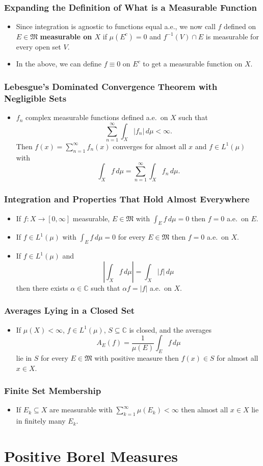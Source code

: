 \documentclass{article}
\newcounter{topicnumber}[section]
\newcommand{\steptopic}[1][1]{\addtocounter{topicnumber}{#1}}
\newenvironment{topic}[1]{%
\steptopic%
\subsubsection{#1}%
\begin{itemize}%
}{%
\end{itemize}%
}
\newcommand{\term}[1]{{\bf #1}}
\newcommand{\remark}{\item}
\begin{document}
\begin{topic}{Expanding the Definition of What is a Measurable Function}
\remark Since integration is agnostic to functions equal a.e., we now call $f$ defined on $E \in \mathfrak{M}$ \term{measurable on $X$} if $\mu(E^c) = 0$ and $f^{-1}(V) \cap E$ is measurable for every open set $V$.
\remark In the above, we can define $f \equiv 0$ on $E^c$ to get a measurable function on $X$.
\end{topic}

\begin{topic}{Lebesgue's Dominated Convergence Theorem with Negligible Sets}
\remark $f_n$ complex measurable functions defined a.e.\ on $X$ such that $$\sum_{n=1}^\infty \int_X |f_n|\,d\mu < \infty.$$ Then $f(x) = \sum_{n=1}^\infty f_n(x)$ converges for almost all $x$ and $f \in L^1(\mu)$ with $$\int_X f\,d\mu = \sum_{n=1}^\infty \int_X f_n\,d\mu.$$
\end{topic}

\begin{topic}{Integration and Properties That Hold Almost Everywhere}
\remark If $f : X \to [0, \infty]$ measurable, $E \in \mathfrak{M}$ with $\int_E f\,d\mu = 0$ then $f = 0$ a.e.\ on $E$.
\remark If $f \in L^1(\mu)$ with $\int_E f\,d\mu = 0$ for every $E \in \mathfrak{M}$ then $f = 0$ a.e.\ on $X$.
\remark If $f \in L^1(\mu)$ and $$\left|\int_X f\,d\mu\right| = \int_X |f|\,d\mu$$ then there exists $\alpha \in \mathbb{C}$ such that $\alpha f = |f|$ a.e.\ on $X$.
\end{topic}

\begin{topic}{Averages Lying in a Closed Set}
\remark If $\mu(X) < \infty$, $f \in L^1(\mu)$, $S \subseteq \mathbb{C}$ is closed, and the averages $$A_E(f) = \dfrac{1}{\mu(E)} \int_E f\,d\mu$$ lie in $S$ for every $E \in \mathfrak{M}$ with positive measure then $f(x) \in S$ for almost all $x \in X$.
\end{topic}

\begin{topic}{Finite Set Membership}
\remark If $E_k \subseteq X$ are measurable with $\sum_{k=1}^\infty \mu(E_k) < \infty$ then almost all $x \in X$ lie in finitely many $E_k$.
\end{topic}


\newpage
\section{Positive Borel Measures}
\end{document}
